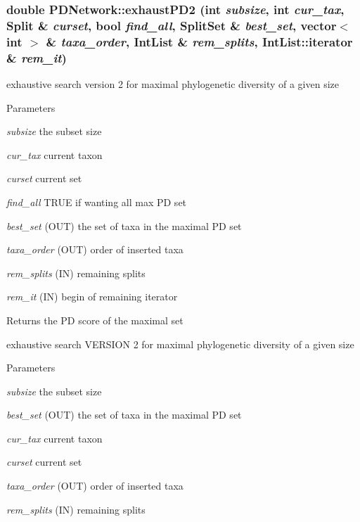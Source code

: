 \hypertarget{classPDNetwork_ac61874535f7ab2a49611444ca53b93cd}{
\subsubsection[{exhaustPD2}]{\setlength{\rightskip}{0pt plus 5cm}double PDNetwork::exhaustPD2 (int {\em subsize}, \/  int {\em cur\_\-tax}, \/  {\bf Split} \& {\em curset}, \/  bool {\em find\_\-all}, \/  {\bf SplitSet} \& {\em best\_\-set}, \/  vector$<$ int $>$ \& {\em taxa\_\-order}, \/  IntList \& {\em rem\_\-splits}, \/  IntList::iterator \& {\em rem\_\-it})}}
\label{classPDNetwork_ac61874535f7ab2a49611444ca53b93cd}
exhaustive search version 2 for maximal phylogenetic diversity of a given size 
\begin{DoxyParams}{Parameters}
\item[{\em subsize}]the subset size \item[{\em cur\_\-tax}]current taxon \item[{\em curset}]current set \item[{\em find\_\-all}]TRUE if wanting all max PD set \item[{\em best\_\-set}](OUT) the set of taxa in the maximal PD set \item[{\em taxa\_\-order}](OUT) order of inserted taxa \item[{\em rem\_\-splits}](IN) remaining splits \item[{\em rem\_\-it}](IN) begin of remaining iterator \end{DoxyParams}
\begin{DoxyReturn}{Returns}
the PD score of the maximal set
\end{DoxyReturn}
exhaustive search VERSION 2 for maximal phylogenetic diversity of a given size 
\begin{DoxyParams}{Parameters}
\item[{\em subsize}]the subset size \item[{\em best\_\-set}](OUT) the set of taxa in the maximal PD set \item[{\em cur\_\-tax}]current taxon \item[{\em curset}]current set \item[{\em taxa\_\-order}](OUT) order of inserted taxa \item[{\em rem\_\-splits}](IN) remaining splits \end{DoxyParams}
